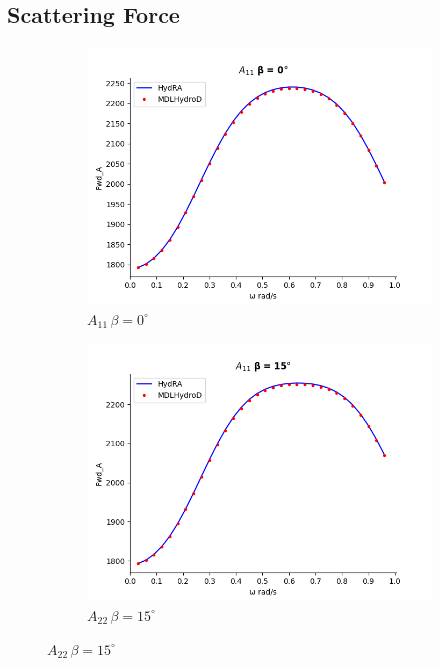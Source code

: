 \subsection{Scattering Force}
\begin{figure}[H]
    \centering
    \begin{subfigure}[b]{0.45\textwidth}
        \includegraphics[width=\textwidth]{plots/kcs/added_mass/A11_BETA_0.png}
        \caption{$A_{11}\, \beta=0^{\circ}$}
    \end{subfigure}
    \begin{subfigure}[b]{0.45\textwidth}
        \includegraphics[width=\textwidth]{plots/kcs/added_mass/A11_BETA_15.png}
        \caption{$A_{22} \, \beta = 15^{\circ}$}
    \end{subfigure}
    \label{fig:kcs_addedmass_5}
\end{figure}

